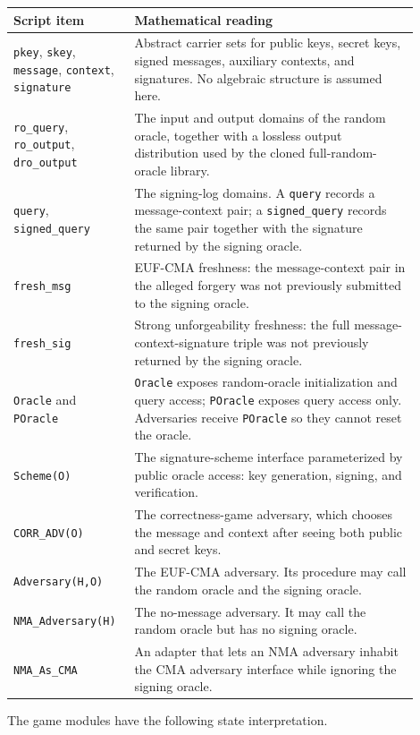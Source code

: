 \documentclass[11pt]{report}
\DeclareRobustCommand{\ec}[1]{\ifmmode\text{\nolinkurl{#1}}\else\nolinkurl{#1}\fi}
\theoremstyle{definition}
\theoremstyle{plain}
\begin{document}
\begin{longtable}{p{0.24\linewidth}p{0.66\linewidth}}
\toprule
\textbf{Script item} & \textbf{Mathematical reading} \\
\midrule
\ec{pkey}, \ec{skey}, \ec{message}, \ec{context}, \ec{signature} &
Abstract carrier sets for public keys, secret keys, signed messages, auxiliary
contexts, and signatures.  No algebraic structure is assumed here. \\
\ec{ro\_query}, \ec{ro\_output}, \ec{dro\_output} &
The input and output domains of the random oracle, together with a lossless
output distribution used by the cloned full-random-oracle library. \\
\ec{query}, \ec{signed\_query} &
The signing-log domains.  A \ec{query} records a message-context pair; a
\ec{signed\_query} records the same pair together with the signature returned by
the signing oracle. \\
\ec{fresh\_msg} &
EUF-CMA freshness: the message-context pair in the alleged forgery was not
previously submitted to the signing oracle. \\
\ec{fresh\_sig} &
Strong unforgeability freshness: the full message-context-signature triple was
not previously returned by the signing oracle. \\
\ec{Oracle} and \ec{POracle} &
\ec{Oracle} exposes random-oracle initialization and query access; \ec{POracle}
exposes query access only.  Adversaries receive \ec{POracle} so they cannot
reset the oracle. \\
\ec{Scheme(O)} &
The signature-scheme interface parameterized by public oracle access: key
generation, signing, and verification. \\
\ec{CORR\_ADV(O)} &
The correctness-game adversary, which chooses the message and context after
seeing both public and secret keys. \\
\ec{Adversary(H,O)} &
The EUF-CMA adversary.  Its procedure may call the random oracle and the signing
oracle. \\
\ec{NMA\_Adversary(H)} &
The no-message adversary.  It may call the random oracle but has no signing
oracle. \\
\ec{NMA\_As\_CMA} &
An adapter that lets an NMA adversary inhabit the CMA adversary interface while
ignoring the signing oracle. \\
\bottomrule
\end{longtable}

The game modules have the following state interpretation.
\end{document}
